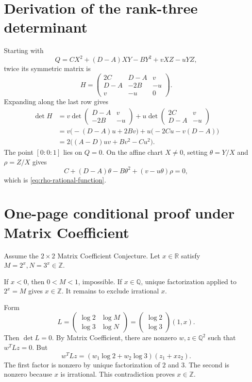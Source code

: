 \documentclass[11pt]{article}
\theoremstyle{definition}
\theoremstyle{remark}
\newcommand{\Q}{\mathbb{Q}}
\newcommand{\Z}{\mathbb{Z}}
\newcommand{\R}{\mathbb{R}}
\begin{document}
\section{Derivation of the rank-three determinant}
\label{app:determinant}

Starting with
\[
 Q=CX^2+(D-A)XY-BY^2+vXZ-uYZ,
\]
twice its symmetric matrix is
\[
 H=\begin{pmatrix}
 2C&D-A&v\\D-A&-2B&-u\\v&-u&0
 \end{pmatrix}.
\]
Expanding along the last row gives
\begin{align*}
 \det H
 &=v\det\begin{pmatrix}D-A&v\\-2B&-u\end{pmatrix}
   +u\det\begin{pmatrix}2C&v\\D-A&-u\end{pmatrix}\\
 &=v\bigl(-(D-A)u+2Bv\bigr)
   +u\bigl(-2Cu-v(D-A)\bigr)\\
 &=2\bigl((A-D)uv+Bv^2-Cu^2\bigr).
\end{align*}
The point $[0:0:1]$ lies on $Q=0$.  On the affine chart $X\ne0$, setting
$\theta=Y/X$ and $\rho=Z/X$ gives
\[
 C+(D-A)\theta-B\theta^2+(v-u\theta)\rho=0,
\]
which is \eqref{eq:rho-rational-function}.

\section{One-page conditional proof under Matrix Coefficient}
\label{app:conditional-proof}

Assume the $2\times2$ Matrix Coefficient Conjecture.  Let $x\in\R$ satisfy
$M=2^x,N=3^x\in\Z$.

If $x<0$, then $0<M<1$, impossible.  If $x\in\Q$, unique factorization applied to
$2^x=M$ gives $x\in\Z$.  It remains to exclude irrational $x$.

Form
\[
 L=\begin{pmatrix}\log2&\log M\\\log3&\log N\end{pmatrix}
  =\begin{pmatrix}\log2\\\log3\end{pmatrix}(1,x).
\]
Then $\det L=0$.  By Matrix Coefficient, there are nonzero $w,z\in\Q^2$ such that
$w^TLz=0$.  But
\[
 w^TLz=(w_1\log2+w_2\log3)(z_1+xz_2).
\]
The first factor is nonzero by unique factorization of $2$ and $3$.  The second is nonzero
because $x$ is irrational.  This contradiction proves $x\in\Z$.
\end{document}
